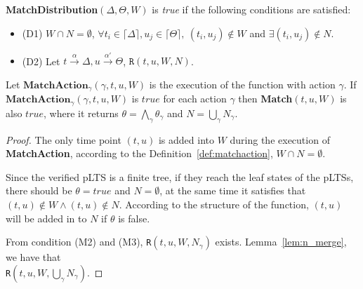 \documentclass[a4paper,UKenglish,cleveref, autoref]{lipics-v2019}
\begin{document}
\begin{definition}\label{def:matchdistribution}
\textbf{MatchDistribution}$(\Delta,\Theta,W)$ is \textit{true} if the following conditions are satisfied:
\begin{itemize}
    \item(D1) $W\cap N=\emptyset$, $\forall t_i\in \lceil\Delta\rceil, u_j\in \lceil\Theta\rceil,\ (t_i,u_j)\notin W$ and $\exists (t_i,u_j)\notin N$.
    \item(D2) Let $t\xrightarrow{\alpha}\Delta, u\xrightarrow{\alpha'}\Theta$, $\texttt{R}(t,u,W,N)$.
\end{itemize}
\end{definition}

\begin{proposition}Let $\textbf{MatchAction}_\gamma(\gamma,t,u,W)$ is the execution of the function with action $\gamma$.
If $\textbf{MatchAction}_\gamma(\gamma,t,u,W)$ is $true$ for each action $\gamma$ then \textbf{Match}$(t,u,W)$ is also $true$, where it returns $\theta=\bigwedge_\gamma\theta_\gamma$ and $N=\bigcup_\gamma N_\gamma$.
\end{proposition}
\begin{proof}
The only time point $(t,u)$ is added into $W$ during the execution of \textbf{MatchAction}, according to the Definition~\ref{def:matchaction}, $W\cap N=\emptyset$.

Since the verified pLTS is a finite tree, if they reach the leaf states of the pLTSs, there should be $\theta=true$ and $N=\emptyset$, at the same time it satisfies that $(t,u)\notin W\wedge(t,u)\notin N$. According to the structure of the function, $(t,u)$ will be added in to $N$ if $\theta$ is false.

From condition (M2) and (M3), \texttt{R}$(t,u,W,N_{\gamma})$ exists. Lemma~\ref{lem:n_merge}, we have that\\ \texttt{R}$(t,u,W,\bigcup_{\gamma}N_{\gamma})$.
\end{proof}
\end{document}
